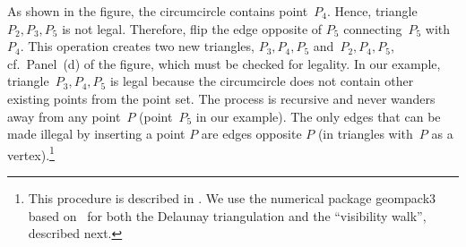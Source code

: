 \documentclass[a4paper,12pt]{article}%
\begin{document}
As shown in the figure, the circumcircle contains point~$P_{4}$. Hence,
triangle~$P_{2},P_{3},P_{5}$ is not legal. Therefore, flip the edge opposite
of $P_{5}$ connecting~$P_{5}$ with~$P_{4}$. This operation creates two new
triangles, $P_{3},P_{4},P_{5}$ and~$P_{2},P_{4},P_{5}$, cf.~Panel~(d) of the
figure, which must be checked for legality. In our example, triangle~$P_{3}%
,P_{4},P_{5}$ is legal because the circumcircle does not contain other
existing points from the point set. The process is recursive and never wanders
away from any point~$P$ (point~$P_{5}$ in our example). The only edges that
can be made illegal by inserting a point $P$ are edges opposite $P$ (in
triangles with~$P$ as a vertex).\footnote{This procedure is described in
%
. We use the numerical package geompack3 based on~%
for both the Delaunay triangulation and the ``visibility walk'', described
next.}%
\end{document}
